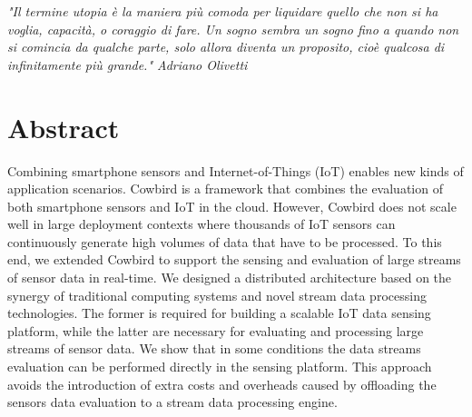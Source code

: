 \documentclass[12pt,twoside]{report}
\begin{document}
\begin{titlepage}               

\thispagestyle{empty}                  
\topmargin=6.5cm                        
\raggedleft                            	
\large                                 		
\em                                    
"Il termine utopia è la maniera più comoda per liquidare quello che non si ha voglia, capacità, o coraggio di fare. Un sogno sembra un sogno fino a quando non si comincia da qualche parte, solo allora diventa un proposito, cioè qualcosa di infinitamente più grande." Adriano Olivetti
\newpage                            
\clearpage{\pagestyle{empty}\cleardoublepage}
\end{titlepage}
\chapter*{Abstract}             
Combining smartphone sensors and Internet-of-Things (IoT) enables new kinds of application scenarios. Cowbird is a framework that combines the evaluation of both smartphone sensors and IoT in the cloud. However, Cowbird does not scale well in large deployment contexts where thousands of IoT sensors can continuously generate high volumes of data that have to be processed. To this end, we extended Cowbird to support the sensing and evaluation of large streams of sensor data in real-time. We designed a distributed architecture based on the synergy of traditional computing systems and novel stream data processing technologies. The former is required for building a scalable IoT data sensing platform, while the latter are necessary for evaluating and processing large streams of sensor data. We show that in some conditions the data streams evaluation can be performed directly in the sensing platform. This approach avoids the introduction of extra costs and overheads caused by offloading the sensors data evaluation to a stream data processing engine.




\end{document}
